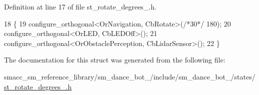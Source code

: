 Definition at line 17 of file st\+\_\+rotate\+\_\+degrees\+\_.\+h.


\begin{DoxyCode}
18   \{
19     configure\_orthogonal<OrNavigation, CbRotate>(\textcolor{comment}{/*30*/} 180);
20     configure\_orthogonal<OrLED, CbLEDOff>();
21     configure\_orthogonal<OrObstaclePerception, CbLidarSensor>();
22   \}
\end{DoxyCode}


The documentation for this struct was generated from the following file\+:\begin{DoxyCompactItemize}
\item 
smacc\+\_\+sm\+\_\+reference\+\_\+library/sm\+\_\+dance\+\_\+bot\+\_/include/sm\+\_\+dance\+\_\+bot\+\_/states/\hyperlink{3_2include_2sm__dance__bot__3_2states_2st__rotate__degrees__3_8h}{st\+\_\+rotate\+\_\+degrees\+\_.\+h}\end{DoxyCompactItemize}

